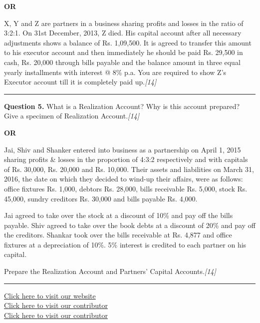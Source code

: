 \documentclass[11pt,a4paper]{article}
\newcommand{\pts}[1]{\hfill   \textit{[#1]}}
\begin{document}
\centerline{   \textbf{OR}}

X, Y and Z are partners in a business sharing profits and losses in the ratio of 3:2:1. On 31st December, 2013, Z died. His capital account after all necessary adjustments shows a balance of Rs. 1,09,500. It is agreed to transfer this amount to his executor account and then immediately he should be paid Rs. 29,500 in cash, Rs. 20,000 through bills payable and the balance amount in three equal yearly installments with interest @ 8\% p.a. You are required to show Z's Executor account till it is completely paid up.\pts{14}

\medskip\rule{\linewidth}{0.2pt}




\noindent   \textbf{Question 5.}
What is a Realization Account? Why is this account prepared? Give a specimen of Realization Account.\pts{14}

\centerline{   \textbf{OR}}

Jai, Shiv and Shanker entered into business as a partnership on April 1, 2015 sharing profits \& losses in the proportion of 4:3:2 respectively and with capitals of Rs. 30,000, Rs. 20,000 and Rs. 10,000. Their assets and liabilities on March 31, 2016, the date on which they decided to wind-up their affairs, were as follows: office fixtures Rs. 1,000, debtors Rs. 28,000, bills receivable Rs. 5,000, stock Rs. 45,000, sundry creditors Rs. 30,000 and bills payable Rs. 4,000.

Jai agreed to take over the stock at a discount of 10\% and pay off the bills payable. Shiv agreed to take over the book debts at a discount of 20\% and pay off the creditors. Shankar took over the bills receivable at Rs. 4,877 and office fixtures at a depreciation of 10\%. 5\% interest is credited to each partner on his capital.

Prepare the Realization Account and Partners' Capital Accounts.\pts{14}

\vfill
\rule{\linewidth}{0.4pt}

\begin{center}\small
\href{https://bhu-exam.vercel.app/}{Click here to visit our website}\\[4pt]
\href{https://me-aryan.vercel.app/}{Click here to visit our contributor}\\[4pt]
\href{https://quashan-me.vercel.app/}{Click here to visit our contributor}
\end{center}
\end{document}
